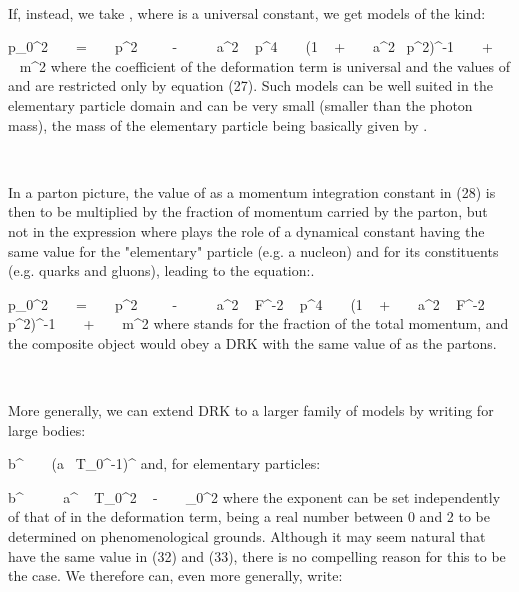 \documentclass[a4paper,12pt,dvips]{article}
\begin{document}
~ 

If, instead, we take \coordHE{} , where \myHighlight{$\rho $}\coordHE{} is a universal constant, we get models of the kind:

\equation
p_{0}^2 ~ ~ = ~ ~ p^2 ~ ~ ~- ~ ~ \rho ~ a^2 ~ p^4 ~ ~ (1 ~ + ~ \rho ~ a^2~ p^2)^{-1} ~ ~ + ~ ~ m^2
\endequation
\noindent
where the coefficient of the deformation term is universal and the values of \coordHE{} and \coordHE{} are restricted only by equation (27). Such models can be well suited in the elementary particle domain and \coordHE{} can be very small (smaller than the photon mass), the mass of the elementary particle being basically given by \coordHE{} .

~ 

In a parton picture, the value of \coordHE{} as a momentum integration constant in (28) is then to be multiplied by the fraction of momentum carried by the parton, but not in the expression \coordHE{} where \coordHE{} plays the role of a dynamical constant having the same value for the "elementary" particle (e.g. a nucleon) and for its constituents (e.g. quarks and gluons), leading to the equation:.

\equation
p_{0}^2 ~ ~ = ~ ~ p^2 ~ ~ ~- ~ ~ \rho ~ a^2 ~ F^{-2} ~ p^4 ~ ~ (1 ~ + ~ \rho ~ a^2 ~ F^{-2} ~ p^2)^{-1} ~ ~ + ~ ~ m^2
\endequation
\noindent
where \coordHE{} stands for the fraction of the total momentum, and the composite object would obey a DRK with the same value of \coordHE{} as the partons.

~ 

More generally, we can extend DRK to a larger family of models by writing for large bodies:

\equation
b^{\eta } ~ \simeq ~ (a ~T_0^{-1})^{\lambda }
\endequation
\noindent
and, for elementary particles:

\equation
b^{\eta } ~ \simeq ~ \rho ~ a^{\lambda } ~ T_0^{2 ~ - ~ \lambda } ~ \eta _0^2
\endequation
\noindent
where the exponent \myHighlight{$\lambda $}\coordHE{} can be set independently of that of \coordHE{} in the deformation term, \myHighlight{$\lambda $}\coordHE{} being a real number between 0 and 2 to be determined on phenomenological grounds. Although it may seem natural that \myHighlight{$\lambda $}\coordHE{} have the same value in (32) and (33), there is no compelling reason for this to be the case. We therefore can, even more generally, write:
\end{document}
